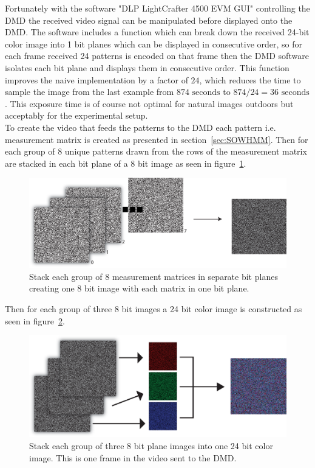 Fortunately with the software "DLP LightCrafter 4500 EVM GUI" controlling the DMD the received video signal can be manipulated before displayed onto the DMD. The software includes a function which can break down the received 24-bit color image into 1 bit planes which can be displayed in consecutive order, so for each frame received 24 patterns is encoded on that frame then the DMD software isolates each bit plane and displays them in consecutive order. This function improves the naive implementation by a factor of $24$, which reduces the time to sample the image from the last example from $874 \text{ seconds to } 874/24 = 36 \text{ seconds}$. This exposure time is of course not optimal for natural images outdoors but acceptably for the experimental setup.\\[0.1in]     


To create the video that feeds the patterns to the DMD each pattern  i.e. measurement matrix is created as presented in section~\ref{sec:SOWHMM}. Then for each group of 8 unique patterns drawn from the rows of the measurement matrix are stacked in each bit plane of a 8 bit image as seen in figure~\ref{fig:8_to_1_8}.

\begin{figure}[H]
\includegraphics[width = 1\linewidth]{gfx/DMD_12.eps}
\caption{Stack each group of 8 measurement matrices in separate  bit planes creating one 8 bit image with each matrix in one bit plane.}
	\label{fig:8_to_1_8}
\end{figure}

Then for each group of three 8 bit images a 24 bit color image is constructed as seen in figure~\ref{fig:3_8_to_1_3}. 

\begin{figure}[H]
\includegraphics[width = 1\linewidth]{gfx/DMD_2.eps}
\caption{Stack each group of three 8 bit plane images into one 24 bit color image. This is one frame in the video sent to the DMD.}
	\label{fig:3_8_to_1_3}
\end{figure}

